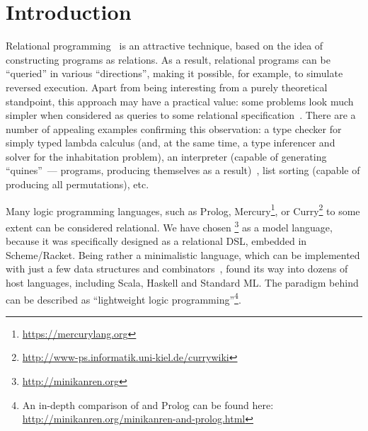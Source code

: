 \section{Introduction}
\label{intro}

Relational programming~\cite{TRS} is an attractive technique, based on the idea 
of constructing programs as relations.  As a result, relational programs can be
``queried'' in various ``directions'', making it possible, for example, to simulate
reversed execution. Apart from being interesting from a purely theoretical standpoint, 
this approach may have a practical value: some problems look much simpler 
when considered as queries to some relational specification~\cite{WillThesis}. There are a 
number of appealing examples confirming this observation: a type checker 
for simply typed lambda calculus (and, at the same time, a type inferencer and solver 
for the inhabitation problem), an interpreter (capable of generating ``quines''~--- 
programs, producing themselves as a result)~\cite{Untagged}, list sorting (capable of 
producing all permutations), etc. 

Many logic programming languages, such as Prolog, Mercury\footnote{\url{https://mercurylang.org}}, 
or Curry\footnote{\url{http://www-ps.informatik.uni-kiel.de/currywiki}} to some extent
can be considered relational. We have chosen \miniKanren\footnote{\url{http://minikanren.org}} 
as a model language, because it was specifically designed as a relational DSL, embedded in Scheme/Racket. 
Being rather a minimalistic language, which can be implemented with just a few data structures and
combinators~\cite{MicroKanren, MuKanrenNew}, \miniKanren found its way into dozens of host languages, including Scala, Haskell and Standard ML.
The paradigm behind \miniKanren can be described as ``lightweight logic programming''\footnote{An in-depth comparison of \miniKanren 
and Prolog can be found here: \url{http://minikanren.org/minikanren-and-prolog.html}}.

